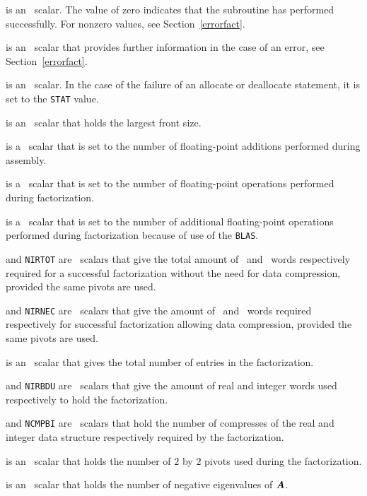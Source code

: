 \documentclass{galahad}
\begin{document}
\begin{description}

 is an \integer\ scalar. The value 
 of zero indicates that the subroutine has performed 
 successfully.  For nonzero values, see Section~\ref{errorfact}. 
 
 is an \integer\ scalar that provides further information in the 
case of an error, see Section~\ref{errorfact}. 
 
 is an \integer\ scalar. In the case of the failure of an 
allocate or deallocate statement, it is set to the {\tt STAT} value. 
 
  is an \integer\ scalar that holds the largest front size. 
 
 is a \realdp\ scalar that is set to the number of 
 floating-point additions performed during assembly. 
 
 is a \realdp\ scalar that is set to the number of 
 floating-point operations performed during factorization. 
 
 is a \realdp\ scalar that is set to the number of 
 additional floating-point operations performed during factorization 
 because of use of the {\tt BLAS}. 
 
 and {\tt NIRTOT} are \integer\ scalars that give the total 
 amount of \realdp\ and \integer\ words respectively required for a 
 successful factorization without the need for data compression, 
 provided the same pivots are used.  
 
 and {\tt NIRNEC} are \integer\ scalars that give the amount 
 of  \realdp\ and \integer\ words required respectively for successful 
 factorization allowing data compression, provided 
 the same pivots are used.  
 
 is an \integer\ scalar that gives the total number of  
 entries in the factorization. 
 
 and {\tt NIRBDU} are \integer\ scalars that give the amount of 
 real and integer words used respectively to hold the factorization. 
 
 and {\tt NCMPBI} are \integer\ scalars that hold the number of 
 compresses of the real and integer data structure respectively 
 required by the factorization. 
 
 is an \integer\ scalar that holds 
 the number of $2$ by $2$ pivots used during the factorization. 
 
 is an \integer\ scalar that holds 
 the number of negative eigenvalues of ${\bm{A}}$. 
 

\end{description}
\end{document}
